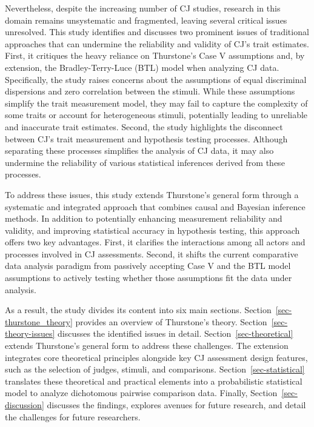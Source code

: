 \documentclass[
  authoryear,
  review,
  1p]{elsarticle}
\begin{document}
Nevertheless, despite the increasing number of CJ studies, research in
this domain remains unsystematic and fragmented, leaving several
critical issues unresolved. This study identifies and discusses two
prominent issues of traditional approaches that can undermine the
reliability and validity of CJ's trait estimates. First, it critiques
the heavy reliance on Thurstone's Case V assumptions
\citep{Thurstone_1927b} and, by extension, the Bradley-Terry-Luce (BTL)
model \citep{Bradley_et_al_1952, Luce_1959} when analyzing CJ data.
Specifically, the study raises concerns about the assumptions of equal
discriminal dispersions and zero correlation between the stimuli. While
these assumptions simplify the trait measurement model, they may fail to
capture the complexity of some traits or account for heterogeneous
stimuli, potentially leading to unreliable and inaccurate trait
estimates. Second, the study highlights the disconnect between CJ's
trait measurement and hypothesis testing processes. Although separating
these processes simplifies the analysis of CJ data, it may also
undermine the reliability of various statistical inferences derived from
these processes.

To address these issues, this study extends Thurstone's general form
through a systematic and integrated approach that combines causal and
Bayesian inference methods. In addition to potentially enhancing
measurement reliability and validity, and improving statistical accuracy
in hypothesis testing, this approach offers two key advantages. First,
it clarifies the interactions among all actors and processes involved in
CJ assessments. Second, it shifts the current comparative data analysis
paradigm from passively accepting Case V and the BTL model assumptions
to actively testing whether those assumptions fit the data under
analysis.

As a result, the study divides its content into six main sections.
Section~\ref{sec-thurstone_theory} provides an overview of Thurstone's
theory. Section~\ref{sec-theory-issues} discusses the identified issues
in detail. Section~\ref{sec-theoretical} extends Thurstone's general
form to address these challenges. The extension integrates core
theoretical principles alongside key CJ assessment design features, such
as the selection of judges, stimuli, and comparisons.
Section~\ref{sec-statistical} translates these theoretical and practical
elements into a probabilistic statistical model to analyze dichotomous
pairwise comparison data. Finally, Section~\ref{sec-discussion}
discusses the findings, explores avenues for future research, and detail
the challenges for future researchers.
\end{document}
